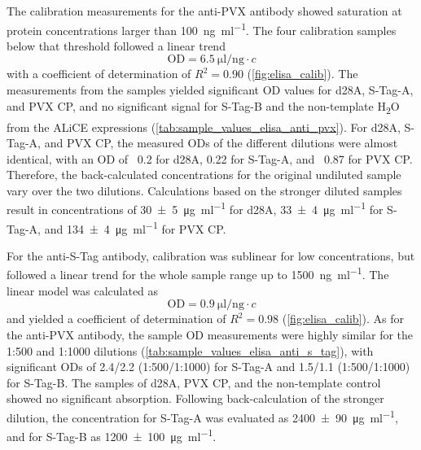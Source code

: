 The calibration measurements for the anti-PVX antibody showed saturation at protein concentrations larger than \SI{100}{\nano\gram\per\milli\litre}. The four calibration samples below that threshold followed a linear trend 
\begin{equation}
\text{OD} = \SI{6.5}{\micro\litre\per\nano\gram} \cdot c
\end{equation}
with a coefficient of determination of $R^2=0.90$ (\autoref{fig:elisa_calib}). The measurements from the samples yielded significant OD values for d28A, S-Tag-A, and PVX CP, and no significant signal for S-Tag-B and the non-template H\textsubscript{2}O from the ALiCE\textsuperscript{\textregistered} expressions (\autoref{tab:sample_values_elisa_anti_pvx}). For d28A, S-Tag-A, and PVX CP, the measured ODs of the different dilutions were almost identical, with an OD of ~0.2 for d28A, 0.22 for S-Tag-A, and ~0.87 for PVX CP. Therefore, the back-calculated concentrations for the original undiluted sample vary over the two dilutions. Calculations based on the stronger diluted samples result in concentrations of \SI[separate-uncertainty=true]{30\pm 5}{\micro\gram\per\milli\litre} for d28A, \SI[separate-uncertainty=true]{33\pm 4}{\micro\gram\per\milli\litre} for S-Tag-A, and \SI[separate-uncertainty=true]{134\pm 4}{\micro\gram\per\milli\litre} for PVX CP. 

For the anti-S-Tag antibody, calibration was sublinear for low concentrations, but followed a linear trend for the whole sample range up to \SI{1500}{\nano\gram\per\milli\litre}. The linear model was calculated as 
\begin{equation}
\text{OD} = \SI{0.9}{\micro\litre\per\nano\gram} \cdot c
\end{equation}
and yielded a coefficient of determination of $R^2 = 0.98$ (\autoref{fig:elisa_calib}). As for the anti-PVX antibody, the sample OD measurements were highly similar for the 1:500 and 1:1000 dilutions (\autoref{tab:sample_values_elisa_anti_s_tag}), with significant ODs of 2.4/2.2 (1:500/1:1000)  for S-Tag-A and 1.5/1.1 (1:500/1:1000) for S-Tag-B. The samples of d28A, PVX CP, and the non-template control showed no significant absorption. Following back-calculation of the stronger dilution, the concentration for S-Tag-A was evaluated as \SI[separate-uncertainty=true]{2400\pm 90}{\micro\gram\per\milli\litre}, and for S-Tag-B as \SI[separate-uncertainty=true]{1200\pm 100}{\micro\gram\per\milli\litre}.

